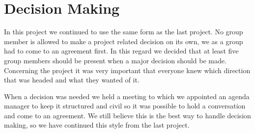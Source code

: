 \section{Decision Making}
In this project we continued to use the same form as the last project. No group member is allowed to make a project related decision on its own, we as a group had to come to an agreement first. In this regard we decided that at least five group members should be present when a major decision should be made. Concerning the project it was very important that everyone knew which direction that was headed and what they wanted of it.

When a decision was needed we held a meeting to which we appointed an agenda manager to keep it structured and civil so it was possible to hold a conversation and come to an agreement.
We still believe this is the best way to handle decision making, so we have continued this style from the last project.